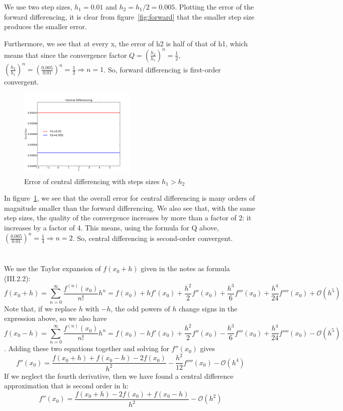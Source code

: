 \documentclass[11pt,letterpaper]{article}
\begin{document}
We use two step sizes, $h_1 = 0.01$ and $h_2 = h_1/2 = 0.005$. 
Plotting the error of the forward differencing, it is clear from figure~\ref{fig:forward} that 
the smaller step size produces the smaller error.

Furthermore, we see that at every x, the error of h2 is half of that of h1, 
which means that since the convergence factor
$Q = \left(\frac{h_2}{h_1}\right)^{n} = \frac{1}{2}$, 
$\left(\frac{h_2}{h_1}\right)^{n} = \left(\frac{0.005}{0.01}\right)^n = \frac{1}{2} 
\Rightarrow n = 1$. So, forward differencing is first-order convergent.

\begin{figure}[bth]
\centering
\includegraphics[width=0.5\textwidth]{central_differencing.pdf}
\caption{Error of central differencing with steps sizes $h_1 > h_2$}
\label{fig:central}
\end{figure}

In figure~\ref{fig:central}, we see that the overall error for central 
differencing is many orders of magnitude smaller than the forward differencing.
We also see that, with the same step sizes, the quality of the convergence 
increases by more than a factor of 2: it increases by a factor of 4. This means,
using the formula for Q above, $\left(\frac{0.005}{0.01}\right)^n = \frac{1}{4} 
\Rightarrow n = 2$. So, central differencing is second-order convergent.

\section{}
We use the Taylor expansion of $f(x_0+h)$ given in the notes as formula (III.2.2):
$$f(x_0+h) = \sum\limits_{n=0}^{\infty} \frac{f^{(n)}(x_0)}{n!}h^n = 
f(x_0) + hf'(x_0) + \frac{h^2}{2}f''(x_0) + \frac{h^3}{6}f'''(x_0) 
+ \frac{h^4}{24}f''''(x_0) + \mathcal{O}(h^5)$$
Note that, if we replace $h$ with $-h$, the odd powers of $h$ change signs 
in the expression above, so we also have 
$$f(x_0-h) = \sum\limits_{n=0}^{\infty} \frac{f^{(n)}(x_0)}{n!}h^n = 
f(x_0) - hf'(x_0) + \frac{h^2}{2}f''(x_0) - \frac{h^3}{6}f'''(x_0) 
+ \frac{h^4}{24}f''''(x_0) - \mathcal{O}(h^5)$$.
Adding these two equations together and solving for $f''(x_0)$ gives
$$f''(x_0) = \frac{f(x_0+h) + f(x_0-h) - 2f(x_0)}{h^2} - \frac{h^2}{12}f''''(x_0) - \mathcal{O}(h^4)$$
If we neglect the fourth derivative, then we have found a central difference
approximation that is second order in h:
$$f''(x_0) = \frac{f(x_0+h) -2f(x_0) + f(x_0-h)}{h^2}  - \mathcal{O}(h^2)$$
\end{document}
